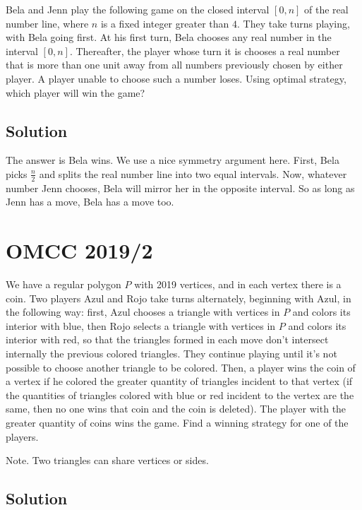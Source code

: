\documentclass[mast]{lucky}
\begin{document}
Bela and Jenn play the following game on the closed interval $[0, n]$ of the real number line, where $n$ is a fixed integer greater than $4$. They take turns playing, with Bela going first. At his first turn, Bela chooses any real number in the interval $[0, n]$. Thereafter, the player whose turn it is chooses a real number that is more than one unit away from all numbers previously chosen by either player. A player unable to choose such a number loses. Using optimal strategy, which player will win the game?

\subsection{Solution}

The answer is Bela wins. We use a nice symmetry argument here. First, Bela picks $\frac{n}{2}$ and splits the real number line into two equal intervals. Now, whatever number Jenn chooses, Bela will mirror her in the opposite interval. So as long as Jenn has a move, Bela has a move too.

\pagebreak\section{OMCC 2019/2}

We have a regular polygon $P$ with 2019 vertices, and in each vertex there is a coin. Two players Azul and Rojo take turns alternately, beginning with Azul, in the following way: first, Azul chooses a triangle with vertices in $P$ and colors its interior with blue, then Rojo selects a triangle with vertices in $P$ and colors its interior with red, so that the triangles formed in each move don't intersect internally the previous colored triangles. They continue playing until it's not possible to choose another triangle to be colored. Then, a player wins the coin of a vertex if he colored the greater quantity of triangles incident to that vertex (if the quantities of triangles colored with blue or red incident to the vertex are the same, then no one wins that coin and the coin is deleted). The player with the greater quantity of coins wins the game. Find a winning strategy for one of the players.

Note. Two triangles can share vertices or sides.

\subsection{Solution}
\end{document}
